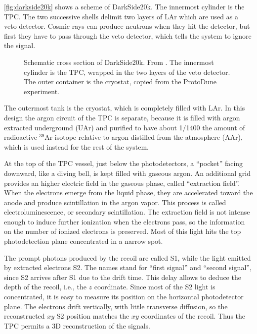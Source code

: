 \autoref{fig:darkside20k} shows a scheme of DarkSide20k. The innermost cylinder
is the TPC. The two successive shells delimit two layers of LAr which are used
as a veto detector. Cosmic rays can produce neutrons when they hit the
detector, but first they have to pass through the veto detector, which tells
the system to ignore the signal.

\begin{figure}[t]
    
    
    \caption{\label{fig:darkside20k} Schematic cross section of DarkSide20k.
    From \cite[2]{aalseth2019}. The innermost cylinder is the TPC, wrapped in
    the two layers of the veto detector. The outer container is the cryostat,
    copied from the ProtoDune experiment.}
    
\end{figure}

The outermost tank is the cryostat, which is completely filled with LAr. In
this design the argon circuit of the TPC is separate, because it is filled with
argon extracted underground (UAr) and purified to have about 1/1400 the amount
of radioactive $^{39}$Ar isotope relative to argon distilled from the
atmosphere (AAr), which is used instead for the rest of the system.

At the top of the TPC vessel, just below the photodetectors, a ``pocket''
facing downward, like a diving bell, is kept filled with gaseous argon. An
additional grid provides an higher electric field in the gaseous phase, called
``extraction field''. When the electrons emerge from the liquid phase, they are
accelerated toward the anode and produce scintillation in the argon vapor. This
process is called electroluminescence, or secondary scintillation. The
extraction field is not intense enough to induce further ionization when the
electrons pass, so the information on the number of ionized electrons is
preserved. Most of this light hits the top photodetection plane concentrated in
a narrow spot.

The prompt photons produced by the recoil are called S1, while the light
emitted by extracted electrons S2. The names stand for ``first signal'' and
``second signal'', since S2 arrives after S1 due to the drift time. This delay
allows to deduce the depth of the recoil, i.e., the $z$ coordinate. Since most
of the S2 light is concentrated, it is easy to measure its position on the
horizontal photodetector plane. The electrons drift vertically, with little
transverse diffusion, so the reconstructed $xy$ S2 position matches the $xy$
coordinates of the recoil. Thus the TPC permits a 3D reconstruction of the
signals.


